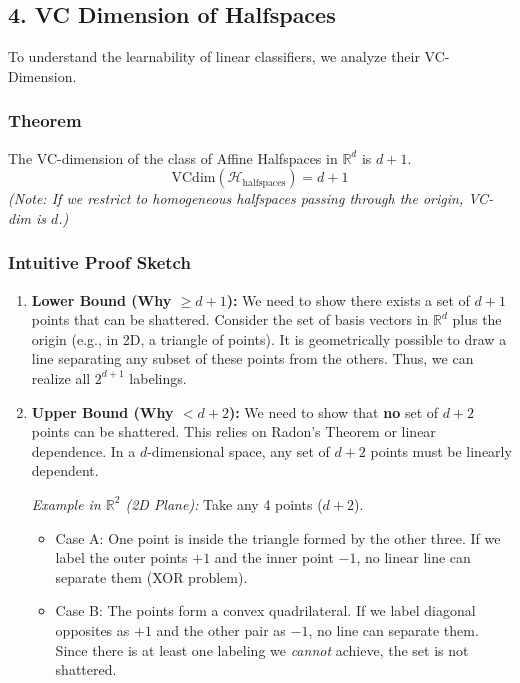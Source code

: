 \documentclass[
  italian,
  11pt,
]{article}
\providecommand{\tightlist}{%
  \setlength{\itemsep}{0pt}\setlength{\parskip}{0pt}}
\begin{document}
\subsection{4. VC Dimension of
Halfspaces}\label{vc-dimension-of-halfspaces}

To understand the learnability of linear classifiers, we analyze their
VC-Dimension.

\subsubsection{Theorem}\label{theorem}

The VC-dimension of the class of Affine Halfspaces in \(\mathbb{R}^d\)
is \textbf{\(d + 1\)}.
\[ \text{VCdim}(\mathcal{H}_{\text{halfspaces}}) = d + 1 \] \emph{(Note:
If we restrict to homogeneous halfspaces passing through the origin,
VC-dim is \(d\).)}

\subsubsection{Intuitive Proof Sketch}\label{intuitive-proof-sketch}

\begin{enumerate}
\def\labelenumi{\arabic{enumi}.}
\item
  \textbf{Lower Bound (Why \(\ge d+1\)):} We need to show there exists a
  set of \(d+1\) points that can be shattered. Consider the set of basis
  vectors in \(\mathbb{R}^d\) plus the origin (e.g., in 2D, a triangle
  of points). It is geometrically possible to draw a line separating any
  subset of these points from the others. Thus, we can realize all
  \(2^{d+1}\) labelings.
\item
  \textbf{Upper Bound (Why \(< d+2\)):} We need to show that \textbf{no}
  set of \(d+2\) points can be shattered. This relies on Radon's Theorem
  or linear dependence. In a \(d\)-dimensional space, any set of \(d+2\)
  points must be linearly dependent.

  \emph{Example in \(\mathbb{R}^2\) (2D Plane):} Take any 4 points
  (\(d+2\)).

  \begin{itemize}
  \tightlist
  \item
    Case A: One point is inside the triangle formed by the other three.
    If we label the outer points \(+1\) and the inner point \(-1\), no
    linear line can separate them (XOR problem).
  \item
    Case B: The points form a convex quadrilateral. If we label diagonal
    opposites as \(+1\) and the other pair as \(-1\), no line can
    separate them. Since there is at least one labeling we \emph{cannot}
    achieve, the set is not shattered.
  \end{itemize}
\end{enumerate}
\end{document}
